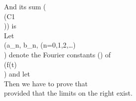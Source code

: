 And its sum (\\(C1\\)) is
\\[ 
\frac{1}{2} \left\{
  f(x + 0) + f(x-0)
\right\}.
\\] 

Let \\(a_{n}, b_{n}, (n=0,1,2,\ldots)\\) denote the Fourier constants
() of
\\(f(t)\\) and let
\\[ 
\frac{1}{2} a_{0} = A_{0},
\hfill
a_{n} \cos n x + b_{n} \sin n x = A_{n}(x),
\hfill
\sum_{n=0}^{m} A_{n}(x) = S_{m}(x).
\\] 

Then we have to prove that
\\[ 
\lim_{m \rightarrow \infty}
\frac{1}{m} \left\{
  A_{0}
  + S_{1}(x) + S_{2}(x) + \cdots + S_{m-1}(x)
\right\}
=
\frac{1}{2} \left\{
  f(x+0) + f(x-0)
\right\},
\\] 
provided that the limits on the right exist.

